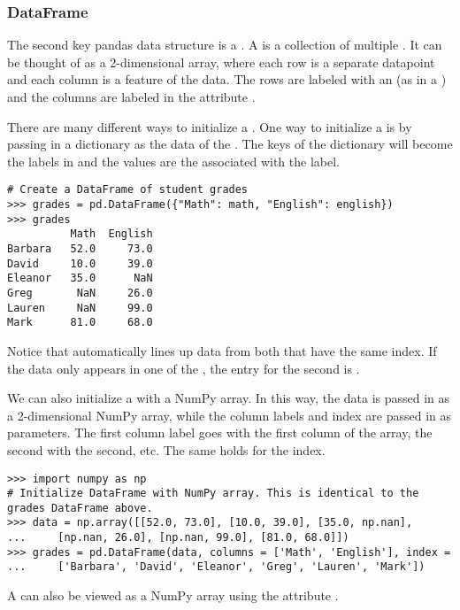 \subsubsection*{DataFrame}

The second key pandas data structure is a .
A  is a collection of multiple .
It can be thought of as a 2-dimensional array, where each row is a separate datapoint and each column is a feature of the data.
The rows are labeled with an  (as in a ) and the columns are labeled in the attribute .


There are many different ways to initialize a .
One way to initialize a  is by passing in a dictionary as the data of the .
The keys of the dictionary will become the labels in  and the values are the  associated with the label.

\begin{lstlisting}
# Create a DataFrame of student grades
>>> grades = pd.DataFrame({"Math": math, "English": english})
>>> grades
	      Math  English
Barbara   52.0     73.0
David     10.0     39.0
Eleanor   35.0      NaN
Greg       NaN     26.0
Lauren     NaN     99.0
Mark      81.0     68.0
\end{lstlisting}

Notice that  automatically lines up data from both  that have the same index.
If the data only appears in one of the , the entry for the second  is .

We can also initialize a  with a NumPy array.
In this way, the data is passed in as a 2-dimensional NumPy array, while the column labels and index are passed in as parameters.
The first column label goes with the first column of the array, the second with the second, etc.
The same holds for the index.

\begin{lstlisting}
>>> import numpy as np
# Initialize DataFrame with NumPy array. This is identical to the grades DataFrame above.
>>> data = np.array([[52.0, 73.0], [10.0, 39.0], [35.0, np.nan],
...		[np.nan, 26.0], [np.nan, 99.0], [81.0, 68.0]])
>>> grades = pd.DataFrame(data, columns = ['Math', 'English'], index =
...		['Barbara', 'David', 'Eleanor', 'Greg', 'Lauren', 'Mark'])
\end{lstlisting}

A  can also be viewed as a NumPy array using the attribute .

